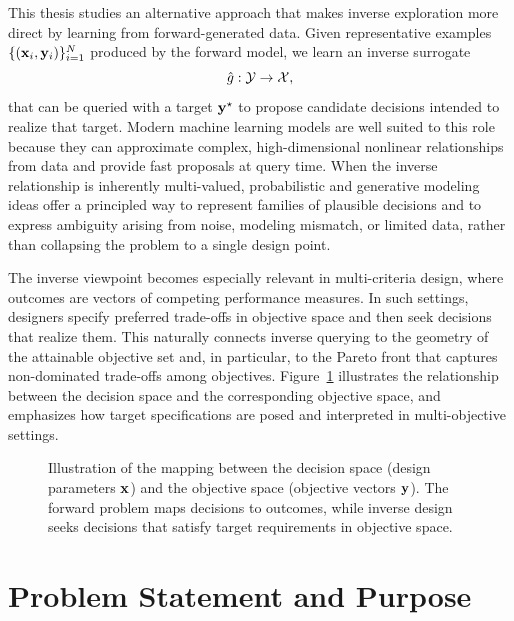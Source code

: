 This thesis studies an alternative approach that makes inverse exploration more direct by learning from forward-generated data. Given representative examples $\{(\mathbf{x}_i,\mathbf{y}_i)\}_{i=1}^N$ produced by the forward model, we learn an inverse surrogate
\begin{equation}
  \hat{g}:\mathcal{Y} \to \mathcal{X},
\end{equation}
that can be queried with a target $\mathbf{y}^{\star}$ to propose candidate decisions intended to realize that target. Modern machine learning models are well suited to this role because they can approximate complex, high-dimensional nonlinear relationships from data and provide fast proposals at query time. When the inverse relationship is inherently multi-valued, probabilistic and generative modeling ideas offer a principled way to represent families of plausible decisions and to express ambiguity arising from noise, modeling mismatch, or limited data, rather than collapsing the problem to a single design point.



The inverse viewpoint becomes especially relevant in multi-criteria design, where outcomes are vectors of competing performance measures. In such settings, designers specify preferred trade-offs in objective space and then seek decisions that realize them. This naturally connects inverse querying to the geometry of the attainable objective set and, in particular, to the Pareto front that captures non-dominated trade-offs among objectives. Figure~\ref{fig:decision_objective_mapping} illustrates the relationship between the decision space and the corresponding objective space, and emphasizes how target specifications are posed and interpreted in multi-objective settings.

\begin{figure}[!htbp]
  \centering
  
  \caption[Decision and Objective Space Mapping]{Illustration of the mapping between the decision space (design parameters $\mathbf{x}$) and the objective space (objective vectors $\mathbf{y}$). The forward problem maps decisions to outcomes, while inverse design seeks decisions that satisfy target requirements in objective space.}
  \label{fig:decision_objective_mapping}
\end{figure}



\section{Problem Statement and Purpose}

